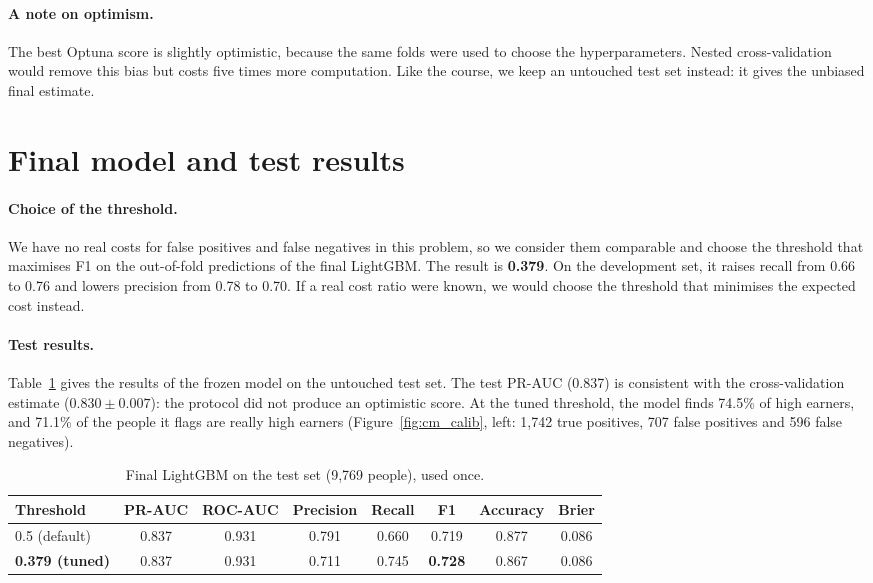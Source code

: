 \documentclass[11pt,a4paper]{article}
\begin{document}
\paragraph{A note on optimism.}
The best Optuna score is slightly optimistic, because the same folds were used to choose the hyperparameters. Nested cross-validation would remove this bias but costs five times more computation. Like the course, we keep an untouched test set instead: it gives the unbiased final estimate.

\section{Final model and test results}
\label{sec:final}

\paragraph{Choice of the threshold.}
We have no real costs for false positives and false negatives in this problem, so we consider them comparable and choose the threshold that maximises F1 on the out-of-fold predictions of the final LightGBM.
The result is \textbf{0.379}. On the development set, it raises recall from 0.66 to 0.76 and lowers precision from 0.78 to 0.70. If a real cost ratio were known, we would choose the threshold that minimises the expected cost instead.

\paragraph{Test results.}
Table~\ref{tab:test} gives the results of the frozen model on the untouched test set.
The test PR-AUC (0.837) is consistent with the cross-validation estimate ($0.830 \pm 0.007$): the protocol did not produce an optimistic score.
At the tuned threshold, the model finds 74.5\% of high earners, and 71.1\% of the people it flags are really high earners (Figure~\ref{fig:cm_calib}, left: 1{,}742 true positives, 707 false positives and 596 false negatives).

\begin{table}[!htbp]
\centering
\small
\caption{Final LightGBM on the test set (9{,}769 people), used once.}
\label{tab:test}
\begin{tabular}{lccccccc}
\toprule
\textbf{Threshold} & \textbf{PR-AUC} & \textbf{ROC-AUC} & \textbf{Precision} & \textbf{Recall} & \textbf{F1} & \textbf{Accuracy} & \textbf{Brier} \\
\midrule
0.5 (default) & 0.837 & 0.931 & 0.791 & 0.660 & 0.719 & 0.877 & 0.086 \\
\textbf{0.379 (tuned)} & 0.837 & 0.931 & 0.711 & 0.745 & \textbf{0.728} & 0.867 & 0.086 \\
\bottomrule
\end{tabular}
\end{table}
\end{document}
